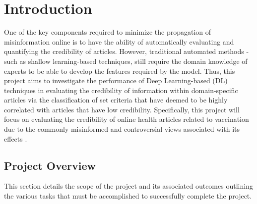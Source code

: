 \documentclass[a4paper,twoside,phd]{BYUPhys}
\begin{document}
 \frontmatter


 \makepreliminarypages


\doublespace
%

%

 \clearemptydoublepage
\singlespace
 \tableofcontents

\clearemptydoublepage
\listoffigures

\clearemptydoublepage
\listoftables

\clearemptydoublepage

\mainmatter
%
\chapter{Introduction}
\label{chap:Introduction}

  

One of the key components required to minimize the propagation of misinformation online is to have the ability of automatically evaluating and quantifying the credibility of articles. However, traditional automated methods - such as shallow learning-based techniques, still require the domain knowledge of experts to be able to develop the features required by the model. Thus, this project aims to investigate the performance of Deep Learning-based (DL) techniques in evaluating the credibility of information within domain-specific articles via the classification of set criteria that have deemed to be highly correlated with articles that have low credibility. Specifically, this project will focus on evaluating the credibility of online health articles related to vaccination due to the commonly misinformed and controversial views associated with its effects \cite{Burgess2006}. \newline


\section{Project Overview}
This section details the scope of the project and its associated outcomes outlining the various tasks that must be accomplished to successfully complete the project.
\end{document}
